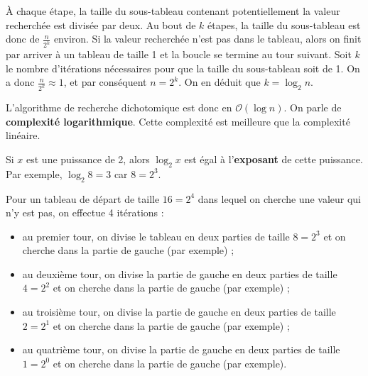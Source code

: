\documentclass[
  a4paper,
  DIV=11,
  numbers=noendperiod]{scrartcl}
\providecommand{\tightlist}{%
  \setlength{\itemsep}{0pt}\setlength{\parskip}{0pt}}\usepackage{longtable,booktabs,array}
\begin{document}
À chaque étape, la taille du sous-tableau contenant potentiellement la
valeur recherchée est divisée par deux. Au bout de \(k\) étapes, la
taille du sous-tableau est donc de \(\frac{n}{2^k}\) environ. Si la
valeur recherchée n'est pas dans le tableau, alors on finit par arriver
à un tableau de taille 1 et la boucle se termine au tour suivant. Soit
\(k\) le nombre d'itérations nécessaires pour que la taille du
sous-tableau soit de 1. On a donc \(\frac{n}{2^k}\approx 1\), et par
conséquent \(n=2^k\). On en déduit que \(k=\log_2 n\).

L'algorithme de recherche dichotomique est donc en
\(\mathcal{O}(\log n)\). On parle de \textbf{complexité logarithmique}.
Cette complexité est meilleure que la complexité linéaire.

\begin{tcolorbox}[enhanced jigsaw, coltitle=black, opacitybacktitle=0.6, breakable, opacityback=0, leftrule=.75mm, colback=white, arc=.35mm, bottomrule=.15mm, colframe=quarto-callout-note-color-frame, colbacktitle=quarto-callout-note-color!10!white, toptitle=1mm, title=\textcolor{quarto-callout-note-color}{\faInfo}\hspace{0.5em}{Notion de logarithme de base 2}, bottomtitle=1mm, titlerule=0mm, left=2mm, toprule=.15mm, rightrule=.15mm]

Si \(x\) est une puissance de 2, alors \(\log_2 x\) est égal à
l'\textbf{exposant} de cette puissance. Par exemple, \(\log_2 8 = 3\)
car \(8 = 2^3\).

\end{tcolorbox}

Pour un tableau de départ de taille \(16=2^4\) dans lequel on cherche
une valeur qui n'y est pas, on effectue 4 itérations :

\begin{itemize}
\tightlist
\item
  au premier tour, on divise le tableau en deux parties de taille
  \(8=2^3\) et on cherche dans la partie de gauche (par exemple) ;
\item
  au deuxième tour, on divise la partie de gauche en deux parties de
  taille \(4=2^2\) et on cherche dans la partie de gauche (par exemple)
  ;
\item
  au troisième tour, on divise la partie de gauche en deux parties de
  taille \(2=2^1\) et on cherche dans la partie de gauche (par exemple)
  ;
\item
  au quatrième tour, on divise la partie de gauche en deux parties de
  taille \(1=2^0\) et on cherche dans la partie de gauche (par exemple).
\end{itemize}
\end{document}
